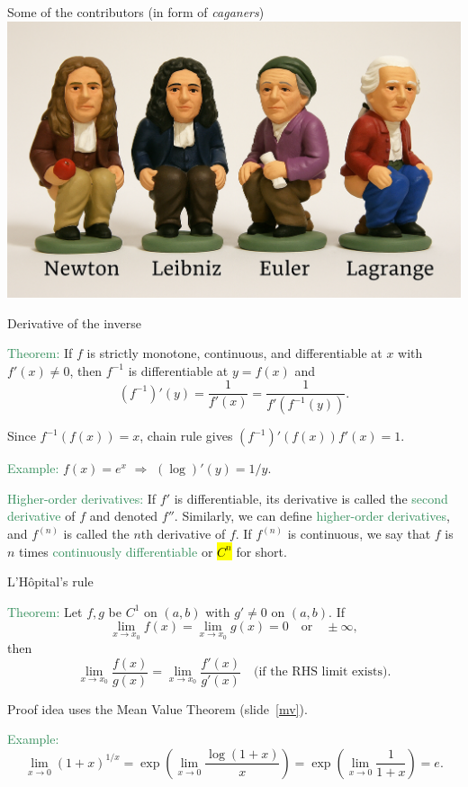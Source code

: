 \documentclass[11pt,aspectratio=169]{beamer}
\begin{document}
\begin{frame}{Some of the contributors (in form of \textit{caganers})}
	\centering\includegraphics[scale=.25]{vbreaks/caganer1}
\end{frame}

\begin{frame}{Derivative of the inverse}

\textcolor{SeaGreen}{Theorem:} If $f$ is strictly monotone, continuous, and differentiable at $x$ with $f'(x)\ne 0$, then $f^{-1}$ is differentiable at $y=f(x)$ and
\[
(f^{-1})'(y)=\frac{1}{f'(x)}=\frac{1}{f'(f^{-1}(y))}.
\]
\begin{tiny}Since $f^{-1}(f(x))=x$, chain rule gives $(f^{-1})'(f(x))f'(x)=1$.\end{tiny}
\bigskip

\textcolor{SeaGreen}{Example:} $f(x)=e^x$ $\Rightarrow$ $(\log)'(y)=1/y$.
\bigskip

\textcolor{SeaGreen}{Higher-order derivatives:} If $f'$ is differentiable,  its derivative is called the \textcolor{SeaGreen}{second derivative} of $f$ and  denoted $f''$. Similarly, we can define \textcolor{SeaGreen}{higher-order derivatives}, and $f^{(n)}$ is called the $n$th derivative of $f$. If $f^{(n)}$ is continuous, we say that $f$ is $n$ times \textcolor{SeaGreen}{continuously differentiable} or \hl{$C^{n}$} for short.
\end{frame}

\begin{frame}{L'H\^opital's rule}

 \textcolor{SeaGreen}{Theorem:} Let $f,g$ be $C^1$ on $(a,b)$ with $g'\ne 0$ on $(a,b)$. If
\[
\lim_{x\to x_0} f(x)=\lim_{x\to x_0} g(x)=0\quad\text{or}\quad \pm\infty,
\]
then
\[
\lim_{x\to x_0}\frac{f(x)}{g(x)}=\lim_{x\to x_0}\frac{f'(x)}{g'(x)} \quad\text{(if the RHS limit exists)}.
\]
\begin{tiny}Proof idea uses the Mean Value Theorem (slide~\ref{mv}).\end{tiny}
\bigskip

\textcolor{SeaGreen}{Example:} 
\[
\lim_{x\to 0}(1+x)^{1/x}
= \exp\!\left(\lim_{x\to 0}\frac{\log(1+x)}{x}\right)
= \exp\!\left(\lim_{x\to 0}\frac{1}{1+x}\right)=e.
\]
\end{frame}
\end{document}
